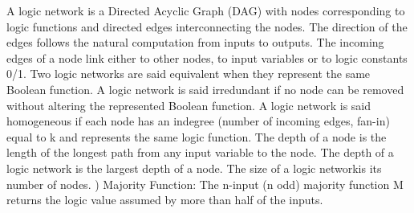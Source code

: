\documentclass[
	accentcolor=1c,%
	type=intern,
	marginpar=false,
	ruledheaders=section,
	class=report,
	BCOR=5mm,
      parskip=half-,
	fontsize=10pt
	]{tudapub}
\begin{document}
{A logic network is a Directed Acyclic Graph (DAG) with nodes corresponding to logic functions
and directed edges interconnecting the nodes. The direction of the edges follows the natural
computation from inputs to outputs. The incoming edges of a node link either to other nodes,
to input variables or to logic constants 0/1. Two logic networks are said equivalent when they
represent the same Boolean function. A logic network is said irredundant if no node can be
removed without altering the represented Boolean function. A logic network is said homogeneous
if each node has an indegree (number of incoming edges, fan-in) equal to k and represents the
same logic function. The depth of a node is the length of the longest path from any input
variable to the node. The depth of a logic network is the largest depth of a node.
The size of a logic networkis its number of nodes.
\newline
{})	Majority Function: \newline
The n-input (n odd) majority function M returns the logic value assumed by more than half
of the inputs.
\newline
}

\newpage
\end{document}
